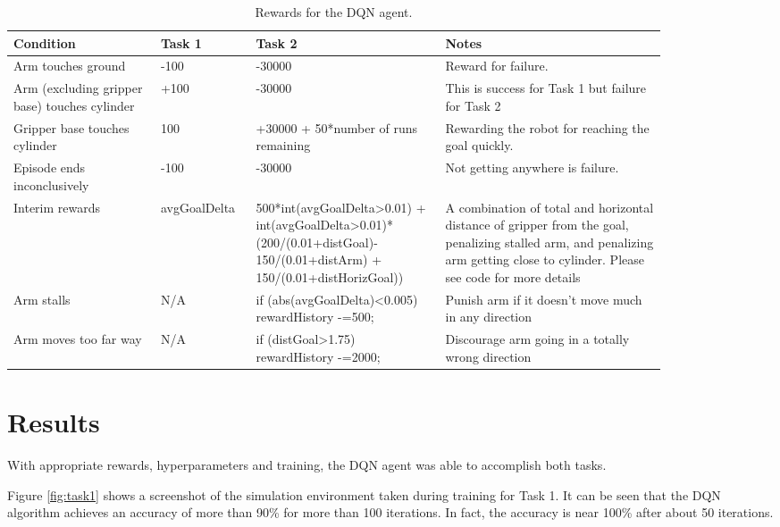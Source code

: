 \documentclass[10pt,journal,compsoc]{IEEEtran}
\begin{document}
\begin{table}[ht]
\caption{Rewards for the DQN agent.}
\centering
\begin{tabular}{p{0.2\linewidth}p{0.1\linewidth}p{0.25\linewidth}p{0.3\linewidth}}
\hline
Condition & Task 1  & Task 2 & Notes\\
\hline
Arm touches ground & -100 & -30000 & Reward for failure.  \\
Arm (excluding gripper base) touches cylinder & +100 & -30000 & This is success for Task 1 but failure for Task 2\\
Gripper base touches cylinder & 100 & +30000 + 50*number of runs remaining & Rewarding the robot for reaching the goal quickly. \\
Episode ends inconclusively & -100 & -30000 & Not getting anywhere is failure.\\
Interim rewards & avgGoalDelta & 500*int(avgGoalDelta>0.01) + int(avgGoalDelta>0.01)* (200/(0.01+distGoal)- 150/(0.01+distArm) + 150/(0.01+distHorizGoal))  & A combination of total and horizontal distance of gripper from the goal, penalizing stalled arm, and penalizing arm getting close to cylinder. Please see code for more details \\
Arm stalls & N/A & if (abs(avgGoalDelta)<0.005) rewardHistory -=500; & Punish arm if it doesn't move much in any direction\\ 
Arm moves too far way & N/A & if (distGoal>1.75) rewardHistory -=2000; & Discourage arm going in a totally wrong direction \\
\hline
\end{tabular}
\end{table}

\section{Results}

With appropriate rewards, hyperparameters and training, the DQN agent was able to accomplish both tasks. 

Figure \ref{fig:task1} shows a screenshot of the simulation environment taken during training for Task 1. It can be seen that the DQN algorithm achieves an accuracy of more than 90\% for more than 100 iterations. In fact, the accuracy is near 100\% after about 50 iterations. 
\end{document}
